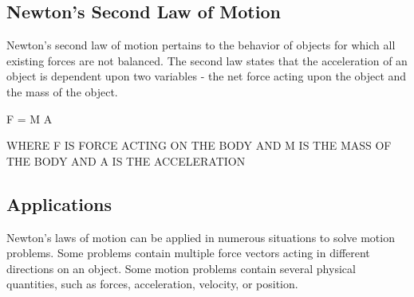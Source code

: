 \subsection{Newton's Second Law of Motion}

 
{




Newton's second law of motion pertains to the behavior of objects for which all existing forces are not balanced. The second law states that the acceleration of an object is dependent upon two variables - the net force acting upon the object and the mass of the object. 


   F = M A 












WHERE F IS FORCE ACTING ON THE BODY AND M IS THE MASS OF THE BODY AND A IS THE ACCELERATION    


}

\subsection{Applications}
{

Newton's laws of motion can be applied in numerous situations to solve motion problems. Some problems contain multiple force vectors acting in different directions on an object. Some motion problems contain several physical quantities, such as forces, acceleration, velocity, or position.

}
